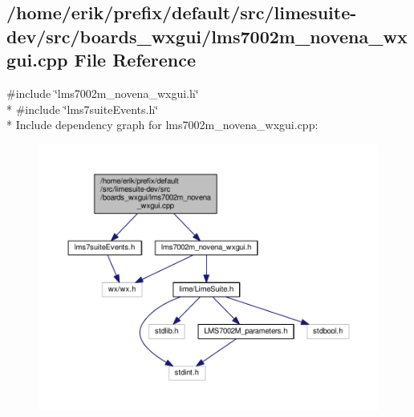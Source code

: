 \subsection{/home/erik/prefix/default/src/limesuite-\/dev/src/boards\+\_\+wxgui/lms7002m\+\_\+novena\+\_\+wxgui.cpp File Reference}
\label{lms7002m__novena__wxgui_8cpp}
{\ttfamily \#include \char`\"{}lms7002m\+\_\+novena\+\_\+wxgui.\+h\char`\"{}}\\*
{\ttfamily \#include \char`\"{}lms7suite\+Events.\+h\char`\"{}}\\*
Include dependency graph for lms7002m\+\_\+novena\+\_\+wxgui.\+cpp\+:
\nopagebreak
\begin{figure}[H]
\begin{center}
\leavevmode
\includegraphics[width=350pt]{d7/d3f/lms7002m__novena__wxgui_8cpp__incl}
\end{center}
\end{figure}
